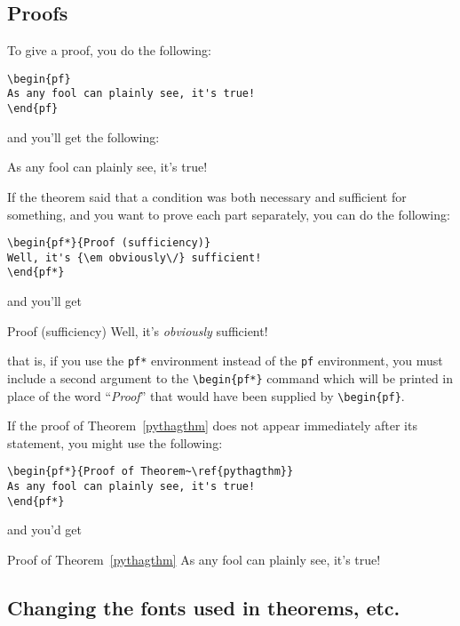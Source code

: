 \subsection{Proofs}

To give a proof, you do the following:
\begin{verbatim}
\begin{pf}
As any fool can plainly see, it's true!
\end{pf}
\end{verbatim}
and you'll get the following:
\begin{pf}
As any fool can plainly see, it's true!
\end{pf}
If the theorem said that a condition was both necessary and sufficient
for something, and you want to prove each part separately,
you can do the following:
\begin{verbatim}
\begin{pf*}{Proof (sufficiency)}
Well, it's {\em obviously\/} sufficient!
\end{pf*}
\end{verbatim}
and you'll get
\begin{pf*}{Proof (sufficiency)}
Well, it's {\em obviously\/} sufficient!
\end{pf*}
that is, if you use the \verb"pf*" environment instead of the
\verb"pf" environment, you must include a second
argument to the \verb"\begin{pf*}" command
which will be printed in place of the word ``{\em Proof\/}''
that would have been supplied by \verb"\begin{pf}".

If the proof of Theorem~\ref{pythagthm} does not appear immediately
after its statement, you might use the following:
\begin{verbatim}
\begin{pf*}{Proof of Theorem~\ref{pythagthm}}
As any fool can plainly see, it's true!
\end{pf*}
\end{verbatim}
and you'd get
\begin{pf*}{Proof of Theorem~\ref{pythagthm}}
As any fool can plainly see, it's true!
\end{pf*}

\subsection{Changing the fonts used in theorems, etc.}
\label{sec:thmfonts}

